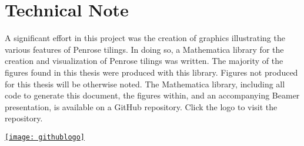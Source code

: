 \chapter*{Technical Note}
\thispagestyle{empty}

A significant effort in this project was the creation of graphics illustrating the various features of Penrose tilings. In doing so, a Mathematica library for the creation and visualization of Penrose tilings was written. The majority of the figures found in this thesis were produced with this library. Figures not produced for this thesis will be otherwise noted. The Mathematica library, including all code to generate this document, the figures within, and an accompanying Beamer presentation, is available on a GitHub repository. Click the logo to visit the repository.

\begin{center}
\href{https://github.com/jessebett/PenroseTilingThesis}{\texttt{[image: githublogo]}}
\end{center}
